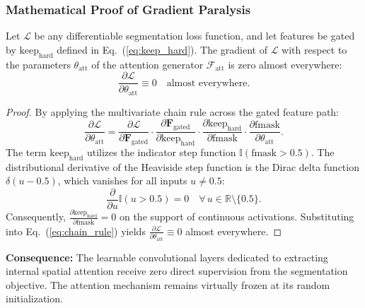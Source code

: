 \subsubsection{Mathematical Proof of Gradient Paralysis}
\begin{theorem}
Let $\mathcal{L}$ be any differentiable segmentation loss function, and let features be gated by $\text{keep}_{\text{hard}}$ defined in Eq.~(\ref{eq:keep_hard}). The gradient of $\mathcal{L}$ with respect to the parameters $\theta_{\text{att}}$ of the attention generator $\mathcal{F}_{\text{att}}$ is zero almost everywhere:
\begin{equation}
  \frac{\partial \mathcal{L}}{\partial \theta_{\text{att}}} \equiv 0 \quad \text{almost everywhere}.
\end{equation}
\end{theorem}

\begin{proof}
By applying the multivariate chain rule across the gated feature path:
\begin{equation}
  \label{eq:chain_rule}
  \frac{\partial \mathcal{L}}{\partial \theta_{\text{att}}} = \frac{\partial \mathcal{L}}{\partial \mathbf{F}_{\text{gated}}} \cdot \frac{\partial \mathbf{F}_{\text{gated}}}{\partial \text{keep}_{\text{hard}}} \cdot \frac{\partial \text{keep}_{\text{hard}}}{\partial \text{fmask}} \cdot \frac{\partial \text{fmask}}{\partial \theta_{\text{att}}}.
\end{equation}
The term $\text{keep}_{\text{hard}}$ utilizes the indicator step function $\mathbb{I}(\text{fmask} > 0.5)$. The distributional derivative of the Heaviside step function is the Dirac delta function $\delta(u - 0.5)$, which vanishes for all inputs $u \neq 0.5$:
\begin{equation}
  \frac{\partial}{\partial u}\mathbb{I}(u > 0.5) = 0 \quad \forall\, u \in \mathbb{R} \setminus \{0.5\}.
\end{equation}
Consequently, $\frac{\partial \text{keep}_{\text{hard}}}{\partial \text{fmask}} = 0$ on the support of continuous activations. Substituting into Eq.~(\ref{eq:chain_rule}) yields $\frac{\partial \mathcal{L}}{\partial \theta_{\text{att}}} \equiv 0$ almost everywhere.
\end{proof}

\textbf{Consequence:} The learnable convolutional layers dedicated to extracting internal spatial attention receive zero direct supervision from the segmentation objective. The attention mechanism remains virtually frozen at its random initialization.

